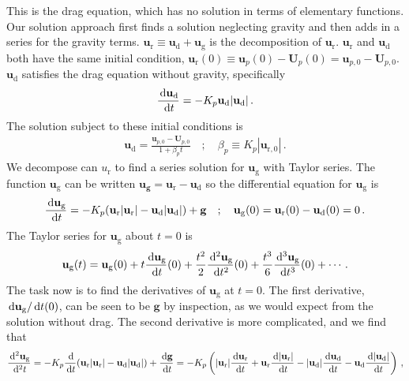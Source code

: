This is the drag equation, which has no solution in terms of elementary functions. Our solution approach first finds a solution neglecting gravity and then adds in a series for the gravity terms. $\mathbf{u}_\text{r} \equiv \mathbf{u}_\text{d} + \mathbf{u}_\text{g}$ is the decomposition of $\mathbf{u}_\text{r}$. $\mathbf{u}_\text{r}$ and $\mathbf{u}_\text{d}$ both have the same initial condition, $\mathbf{u}_\text{r}(0) \equiv \mathbf{u}_p(0) - \mathbf{U}_p(0) = \mathbf{u}_{p,0} - \mathbf{U}_{p,0}$. $\mathbf{u}_\text{d}$ satisfies the drag equation without gravity, specifically
\begin{align}
    \frac{\,\mathrm{d} \mathbf{u}_\text{d}}{\,\mathrm{d} t} = -K_p \mathbf{u}_\text{d} |\mathbf{u}_\text{d}| \,.
\end{align}
The solution subject to these initial conditions is
\begin{align}
    \label{ud_exact}
    \mathbf{u}_\text{d} = \frac{\mathbf{u}_{p,0} - \mathbf{U}_{p,0}}{1 + \beta_p t} \quad ; \quad \beta_p \equiv K_p |\mathbf{u}_{\text{r},0}| \,.
\end{align}
We decompose can $u_\text{r}$ to find a series solution for $\mathbf{u}_\text{g}$ with Taylor series. The function $\mathbf{u}_\text{g}$ can be written $\mathbf{u_g} = \mathbf{u}_\text{r} - \mathbf{u}_\text{d}$ so the differential equation for $\mathbf{u}_\text{g}$ is
\begin{align}
    \frac{\,\mathrm{d} \mathbf{u}_\text{g}}{\,\mathrm{d} t} = -K_p (\mathbf{u}_\text{r} |\mathbf{u}_\text{r}| - \mathbf{u}_\text{d} |\mathbf{u}_\text{d}|) + \mathbf{g} \quad ; \quad \mathbf{u}_\text{g}(0) = \mathbf{u}_\text{r}(0) - \mathbf{u}_\text{d}(0) = 0 \,.
\end{align}
The Taylor series for $\mathbf{u}_\text{g}$ about $t = 0$ is
\begin{align}
    \mathbf{u}_\text{g}(t) = \mathbf{u}_\text{g}(0) + t \frac{\,\mathrm{d} \mathbf{u}_\text{g}}{\,\mathrm{d} t}(0) + \frac{t^2}{2} \frac{\,\mathrm{d}^2 \mathbf{u}_\text{g}}{\,\mathrm{d} t^2}(0) + \frac{t^3}{6} \frac{\,\mathrm{d}^3 \mathbf{u}_\text{g}}{\,\mathrm{d} t^3}(0) + \cdots \,.
\end{align}
The task now is to find the derivatives of $\mathbf{u}_\text{g}$ at $t = 0$. The first derivative, $\,\mathrm{d} \mathbf{u}_\text{g} / \,\mathrm{d} t(0)$, can be seen to be $\mathbf{g}$ by inspection, as we would expect from the solution without drag. The second derivative is more complicated, and we find that
\begin{align*}
    \frac{\,\mathrm{d}^2 \mathbf{u}_\text{g}}{\,\mathrm{d}^2 t} = -K_p \frac{\,\mathrm{d}}{\,\mathrm{d} t}(\mathbf{u}_\text{r} |\mathbf{u}_\text{r}| - \mathbf{u}_\text{d} |\mathbf{u}_\text{d}|) + \frac{\,\mathrm{d} \mathbf{g}}{\,\mathrm{d} t} = -K_p \left(|\mathbf{u}_\text{r}| \frac{\,\mathrm{d} \mathbf{u}_\text{r}}{\,\mathrm{d} t} + \mathbf{u}_\text{r} \frac{\,\mathrm{d} |\mathbf{u}_\text{r}|}{\,\mathrm{d} t} - |\mathbf{u}_\text{d}| \frac{\,\mathrm{d} \mathbf{u}_\text{d}}{\,\mathrm{d} t} - \mathbf{u}_\text{d} \frac{\,\mathrm{d} |\mathbf{u}_\text{d}|}{\,\mathrm{d} t}\right) \,,
\end{align*}
